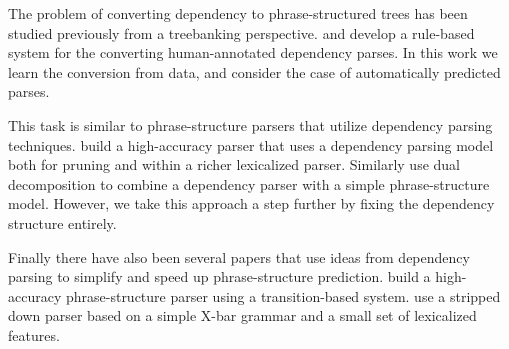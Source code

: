 \documentclass[11pt,letterpaper]{article}
\begin{document}
The problem of converting dependency to phrase-structured trees has
been studied previously from a treebanking perspective.
 and  develop a
rule-based system for the converting human-annotated dependency
parses. In this work we learn the conversion from data, and consider
the case of automatically predicted parses.

This task is similar to phrase-structure parsers that utilize
dependency parsing techniques.  build a
high-accuracy parser that uses a dependency parsing model both for
pruning and within a richer lexicalized parser. Similarly
 use dual decomposition to combine a dependency
parser with a simple phrase-structure model. However, we take this
approach a step further by fixing the dependency structure
entirely.


Finally there have also been several papers that use ideas from
dependency parsing to simplify and speed up phrase-structure prediction.
 build a high-accuracy phrase-structure parser
using a transition-based system.  use a stripped
down parser based on a simple X-bar grammar and a small set of lexicalized features.






\end{document}
